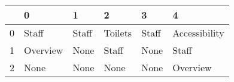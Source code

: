 \begin{tabular}{llllll}
\toprule
{} &         0 &      1 &        2 &      3 &              4 \\
\midrule
0 &     Staff &  Staff &  Toilets &  Staff &  Accessibility \\
1 &  Overview &   None &    Staff &   None &          Staff \\
2 &      None &   None &     None &   None &       Overview \\
\bottomrule
\end{tabular}
